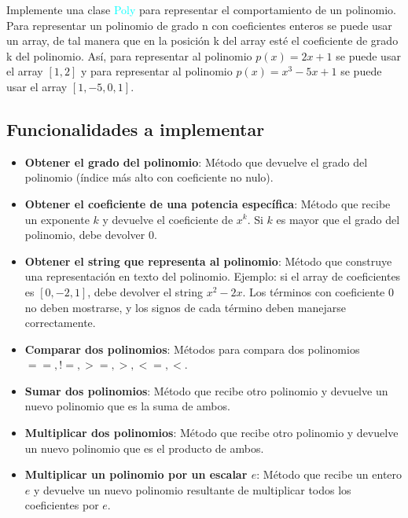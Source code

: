 Implemente una clase \textcolor{cyan}{Poly} para representar el comportamiento de un polinomio. Para representar un polinomio de grado n con coeficientes enteros se puede usar un array, de tal manera que en la posición k del array esté el coeficiente de grado k del polinomio. Así, para representar al polinomio \(p(x)=2 x+1\) se puede usar el array \([1,2]\) y para representar al polinomio \(p(x)=x^3-5x+1\) se puede usar el array \([1,-5,0,1]\).

\subsection*{Funcionalidades a implementar}

\begin{itemize}
    \item \textbf{Obtener el grado del polinomio}: Método que devuelve el grado del polinomio (índice más alto con coeficiente no nulo).
    
    \item \textbf{Obtener el coeficiente de una potencia específica}: Método que recibe un exponente \(k\) y devuelve el coeficiente de \(x^k\). Si \(k\) es mayor que el grado del polinomio, debe devolver 0.
    
    \item \textbf{Obtener el string que representa al polinomio}: Método que construye una representación en texto del polinomio. Ejemplo: si el array de coeficientes es \([0, -2, 1]\), debe devolver el string \(x^2 - 2x\). Los términos con coeficiente 0 no deben mostrarse, y los signos de cada término deben manejarse correctamente.
    
    \item \textbf{Comparar dos polinomios}: Métodos para compara dos polinomios $==, !=, >=, >, <=, <$.
    
    \item \textbf{Sumar dos polinomios}: Método que recibe otro polinomio y devuelve un nuevo polinomio que es la suma de ambos.
    
    \item \textbf{Multiplicar dos polinomios}: Método que recibe otro polinomio y devuelve un nuevo polinomio que es el producto de ambos.
    
    \item \textbf{Multiplicar un polinomio por un escalar \(e\)}: Método que recibe un entero \(e\) y devuelve un nuevo polinomio resultante de multiplicar todos los coeficientes por \(e\).
    

\end{itemize}
